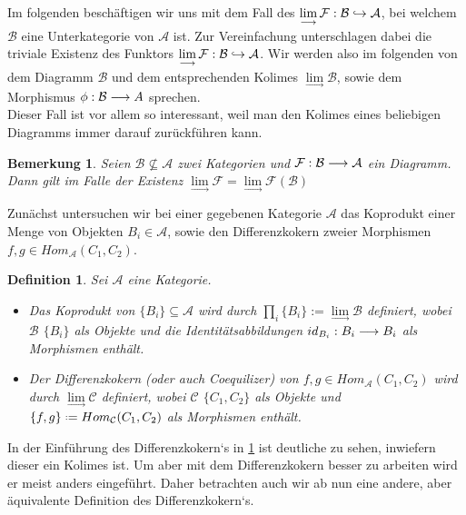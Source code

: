 \documentclass[10pt,a4paper]{report}
\newcounter{Aussage}[chapter]
\newtheorem{bem}[Aussage]{Bemerkung}
\newtheorem{definition}[Aussage]{Definition}
\newcommand{\functionfront}[3]{\nolinebreak{#1:#2 \longrightarrow #3}}
\newcommand{\infunctionfront}[3]{\nolinebreak{#1:#2 \hookrightarrow #3}}
\newcommand{\colimes}[0]{\lim\limits_{ \longrightarrow }}
\newcommand*{\defeq}{\mathrel{\vcenter{\baselineskip0.5ex \lineskiplimit0pt
                     \hbox{\scriptsize.}\hbox{\scriptsize.}}}%
                     =}
\begin{document}
Im folgenden beschäftigen wir uns mit dem Fall des $\colimes \infunctionfront{\mathcal{F}}{\mathcal{B}}{\mathcal{A}}$, bei welchem $\mathcal{B}$ eine Unterkategorie von $\mathcal{A}$ ist. Zur Vereinfachung unterschlagen dabei die triviale Existenz des Funktors $\colimes \infunctionfront{\mathcal{F}}{\mathcal{B}}{\mathcal{A}}$. Wir werden also im folgenden von dem Diagramm $\mathcal{B}$ und dem entsprechenden Kolimes $\colimes \mathcal{B}$, sowie dem Morphismus $\functionfront{\phi}{\mathcal{B}}{A} $ sprechen.\\ 
Dieser Fall ist vor allem so interessant, weil man den Kolimes eines beliebigen Diagramms immer darauf zurückführen kann.
\begin{bem}\label{Vereinfachung des Kolimes}
Seien $\mathcal{B} \nsubseteq \mathcal{A}$ zwei Kategorien und $\functionfront{\mathcal{F}}{\mathcal{B}}{\mathcal{A}}$ ein Diagramm.\\
Dann gilt im Falle der Existenz $\colimes \mathcal{F} = \colimes \mathcal{F}(\mathcal{B})$ 
\end{bem}


Zunächst untersuchen wir bei einer gegebenen Kategorie $\mathcal{A}$ das Koprodukt einer Menge von Objekten $B_i \in \mathcal{A}$, sowie den Differenzkokern zweier Morphismen $f,g \in Hom_{\mathcal{A}}(C_1,C_2)$.

\begin{definition} \label{DifferenzkokernUndKoproduktDef}
Sei $\mathcal{A}$ eine Kategorie.
\begin{itemize}
\item Das Koprodukt von $ \lbrace B_i \rbrace \subseteq \mathcal{A}$ wird durch $\prod_i \lbrace B_i \rbrace := \colimes\mathcal{B}$ definiert, 
wobei $\mathcal{B}$ $\lbrace B_i \rbrace$ als Objekte und die Identitätsabbildungen $\functionfront{id_{B_i}}{B_i}{B_i}$ als Morphismen enthält.
\item Der Differenzkokern (oder auch Coequilizer) von $f,g \in Hom_{\mathcal{A}}(C_1,C_2)$ wird durch $\colimes \mathcal{C}$ definiert,
wobei $\mathcal{C}$ $\lbrace C_1,C_2 \rbrace$ als Objekte und $ \lbrace f,g \rbrace \defeq Hom_{\mathcal{C}}(C_1,C_2)$ als Morphismen enthält.
\end{itemize}
\end{definition}

In der Einführung des Differenzkokern`s in \cref{DifferenzkokernUndKoproduktDef} ist deutliche zu sehen, inwiefern dieser ein Kolimes ist. Um aber mit dem Differenzkokern besser zu arbeiten wird er meist anders eingeführt. Daher betrachten auch wir ab nun eine andere, aber äquivalente Definition des Differenzkokern`s.
\end{document}
